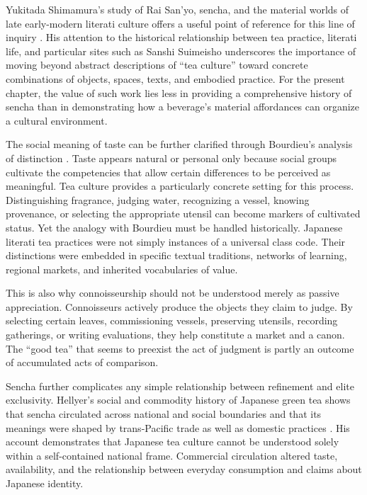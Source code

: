 \documentclass[numbers]{IntechOpen-Book}
\begin{document}
Yukitada Shimamura's study of Rai San'yo, sencha, and the material worlds of late early-modern literati culture offers a useful point of reference for this line of inquiry \cite{shimamura}. His attention to the historical relationship between tea practice, literati life, and particular sites such as Sanshi Suimeisho underscores the importance of moving beyond abstract descriptions of ``tea culture'' toward concrete combinations of objects, spaces, texts, and embodied practice. For the present chapter, the value of such work lies less in providing a comprehensive history of sencha than in demonstrating how a beverage's material affordances can organize a cultural environment.

The social meaning of taste can be further clarified through Bourdieu's analysis of distinction \cite{bourdieu}. Taste appears natural or personal only because social groups cultivate the competencies that allow certain differences to be perceived as meaningful. Tea culture provides a particularly concrete setting for this process. Distinguishing fragrance, judging water, recognizing a vessel, knowing provenance, or selecting the appropriate utensil can become markers of cultivated status. Yet the analogy with Bourdieu must be handled historically. Japanese literati tea practices were not simply instances of a universal class code. Their distinctions were embedded in specific textual traditions, networks of learning, regional markets, and inherited vocabularies of value.

This is also why connoisseurship should not be understood merely as passive appreciation. Connoisseurs actively produce the objects they claim to judge. By selecting certain leaves, commissioning vessels, preserving utensils, recording gatherings, or writing evaluations, they help constitute a market and a canon. The ``good tea'' that seems to preexist the act of judgment is partly an outcome of accumulated acts of comparison.

Sencha further complicates any simple relationship between refinement and elite exclusivity. Hellyer's social and commodity history of Japanese green tea shows that sencha circulated across national and social boundaries and that its meanings were shaped by trans-Pacific trade as well as domestic practices \cite{hellyer}. His account demonstrates that Japanese tea culture cannot be understood solely within a self-contained national frame. Commercial circulation altered taste, availability, and the relationship between everyday consumption and claims about Japanese identity.
\end{document}
